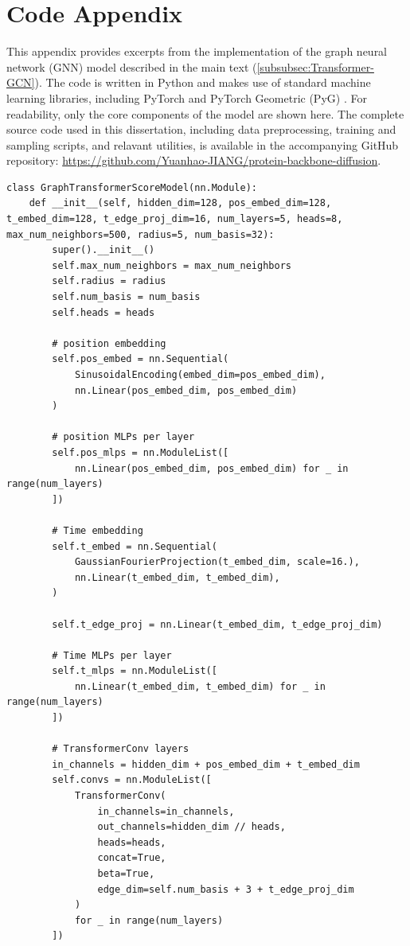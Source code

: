 \documentclass[a4paper,12pt]{article}
\begin{document}
\section{Code Appendix}
This appendix provides excerpts from the implementation of the graph neural network (GNN) model described in the main text (\cref{subsubsec:Transformer-GCN}). The code is written in Python and makes use of standard machine learning libraries, including PyTorch and PyTorch Geometric (PyG) \citep{PyG1.0,PyG2.0}. For readability, only the core components of the model are shown here. The complete source code used in this dissertation, including data preprocessing, training and sampling scripts, and relavant utilities, is available in the accompanying GitHub repository: \url{https://github.com/Yuanhao-JIANG/protein-backbone-diffusion}.
\begin{verbatim}
class GraphTransformerScoreModel(nn.Module):
    def __init__(self, hidden_dim=128, pos_embed_dim=128, t_embed_dim=128, t_edge_proj_dim=16, num_layers=5, heads=8, max_num_neighbors=500, radius=5, num_basis=32):
        super().__init__()
        self.max_num_neighbors = max_num_neighbors
        self.radius = radius
        self.num_basis = num_basis
        self.heads = heads

        # position embedding
        self.pos_embed = nn.Sequential(
            SinusoidalEncoding(embed_dim=pos_embed_dim),
            nn.Linear(pos_embed_dim, pos_embed_dim)
        )

        # position MLPs per layer
        self.pos_mlps = nn.ModuleList([
            nn.Linear(pos_embed_dim, pos_embed_dim) for _ in range(num_layers)
        ])

        # Time embedding
        self.t_embed = nn.Sequential(
            GaussianFourierProjection(t_embed_dim, scale=16.),
            nn.Linear(t_embed_dim, t_embed_dim),
        )

        self.t_edge_proj = nn.Linear(t_embed_dim, t_edge_proj_dim)

        # Time MLPs per layer
        self.t_mlps = nn.ModuleList([
            nn.Linear(t_embed_dim, t_embed_dim) for _ in range(num_layers)
        ])

        # TransformerConv layers
        in_channels = hidden_dim + pos_embed_dim + t_embed_dim
        self.convs = nn.ModuleList([
            TransformerConv(
                in_channels=in_channels,
                out_channels=hidden_dim // heads,
                heads=heads,
                concat=True,
                beta=True,
                edge_dim=self.num_basis + 3 + t_edge_proj_dim
            )
            for _ in range(num_layers)
        ])


\end{verbatim}
\end{document}
